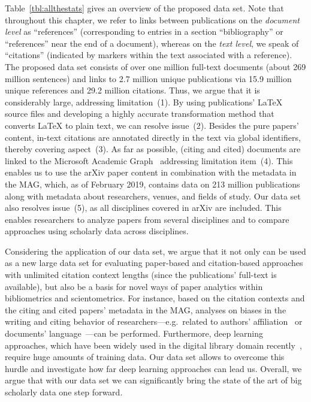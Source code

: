 Table~\ref{tbl:allthestats} gives an overview of the proposed data set. Note that throughout this chapter, we refer to links between publications on the \emph{document level} as ``references'' (corresponding to entries in a section ``bibliography'' or ``references'' near the end of a document), whereas on the \emph{text level}, we speak of ``citations'' (indicated by markers within the text associated with a reference). The proposed data set consists of over one million full-text documents (about 269 million sentences) and links to 2.7 million unique publications via 15.9 million unique references and 29.2 million citations.
Thus, we argue that it is considerably large, addressing limitation~(1). By using publications' \LaTeX{} source files and developing a highly accurate transformation method that converts \LaTeX{} to plain text, we can resolve issue~(2). Besides the pure papers' content, in-text citations are annotated directly in the text via global identifiers, thereby covering aspect~(3). As far as possible, (citing and cited) documents are linked to the Microsoft Academic Graph~\cite{Sinha2015} addressing limitation item~(4). This enables us to use the arXiv paper content in combination with the metadata in the MAG, which, as of February 2019, contains data on 213 million publications along with metadata about researchers, venues, and fields of study. Our data set also resolves issue~(5), as all disciplines covered in arXiv are included. This enables researchers to analyze papers from several disciplines and to compare approaches using scholarly data across disciplines.

Considering the application of our data set, we argue that it not only can be used as a new large data set for evaluating paper-based and citation-based approaches with unlimited citation context lengths (since the publications' full-text is available),
but also be a basis for novel ways of paper analytics within bibliometrics and scientometrics. For instance, based on the citation contexts and the citing and cited papers' metadata in the MAG, analyses on biases in the writing and citing behavior of researchers---e.g.\ related to authors' affiliation~\cite{Reingewertz2018} or documents' language~\cite{Liang2013,Liu2018}---can be performed.
Furthermore, deep learning approaches, which have been widely used in the digital library domain recently~\cite{Ebensu2017}, require huge amounts of training data. Our data set allows to overcome this hurdle and investigate how far deep learning approaches can lead us.
Overall, we argue that with our data set we can significantly bring the state of the art of big scholarly data one step forward.

